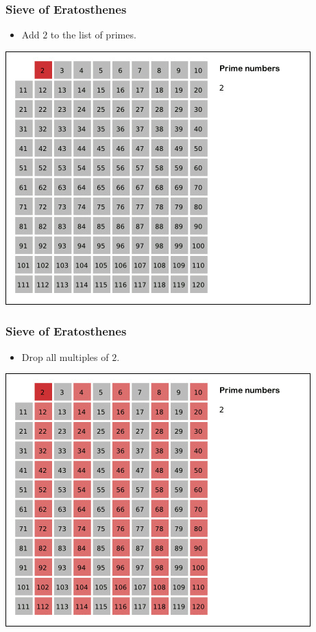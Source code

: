 \documentclass[11pt]{beamer}
\begin{document}
\begin{frame}
\frametitle{Sieve of Eratosthenes}
\centering
\begin{itemize}
  \item  Add $2$ to  the list of primes.
\end{itemize}
    \includegraphics[scale=0.45]{resources/sieve-1.jpg}
\end{frame}

\begin{frame}
\frametitle{Sieve of Eratosthenes}
\centering
\begin{itemize}
  \item Drop all multiples of $2$.
\end{itemize}
    \includegraphics[scale=0.45]{resources/sieve-60.jpg}
\end{frame}
\end{document}
